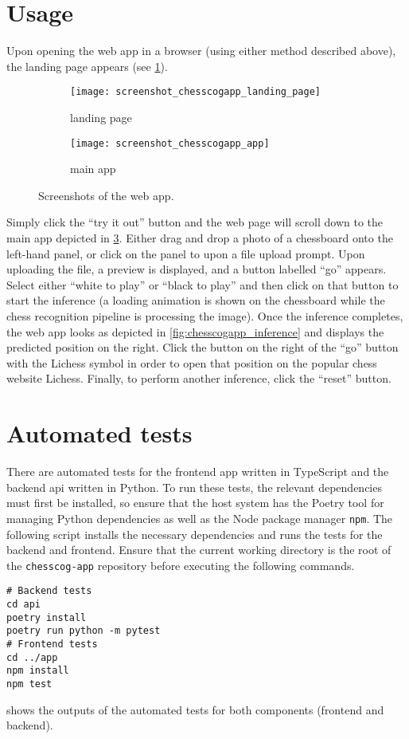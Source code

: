 \documentclass[../../report.tex]{subfiles}
\begin{document}
\section{Usage}
Upon opening the web app in a browser (using either method described above), the landing page appears (see \cref{fig:chesscogapp_landing_page}).
\begin{figure}
    \centering
    \begin{subfigure}[b]{\textwidth}
        \texttt{[image: screenshot\_chesscogapp\_landing\_page]}
        \caption{landing page}
        \label{fig:chesscogapp_landing_page}
    \end{subfigure}
    \hfill
    \medskip\par
    \begin{subfigure}[b]{\textwidth}
        \texttt{[image: screenshot\_chesscogapp\_app]}
        \caption{main app}
        \label{fig:chesscogapp_main_app}
    \end{subfigure}
    \caption{Screenshots of the web app.}
\end{figure}
Simply click the ``try it out'' button and the web page will scroll down to the main app depicted in \cref{fig:chesscogapp_main_app}.
Either drag and drop a photo of a chessboard onto the left-hand panel, or click on the panel to upon a file upload prompt.
Upon uploading the file, a preview is displayed, and a button labelled ``go'' appears.
Select either ``white to play'' or ``black to play'' and then click on that button to start the inference (a loading animation is shown on the chessboard while the chess recognition pipeline is processing the image).
Once the inference completes, the web app looks as depicted in \cref{fig:chesscogapp_inference} and displays the predicted position on the right.
Click the button on the right of the ``go'' button with the Lichess symbol in order to open that position on the popular chess website Lichess.
Finally, to perform another inference, click the ``reset'' button.

\section{Automated tests}
\label{sec:chesscogapp_tests}
There are automated tests for the frontend app written in TypeScript and the backend \gls{api} written in Python.
To run these tests, the relevant dependencies must first be installed, so ensure that the host system has the Poetry tool for managing Python dependencies as well as the Node package manager \texttt{npm}.
The following script installs the necessary dependencies and runs the tests for the backend and frontend.
Ensure that the current working directory is the root of the \texttt{chesscog-app} repository before executing the following commands.
\begin{verbatim}
# Backend tests
cd api
poetry install
poetry run python -m pytest
# Frontend tests
cd ../app
npm install
npm test
\end{verbatim}
 shows the outputs of the automated tests for both components (frontend and backend).
\end{document}
